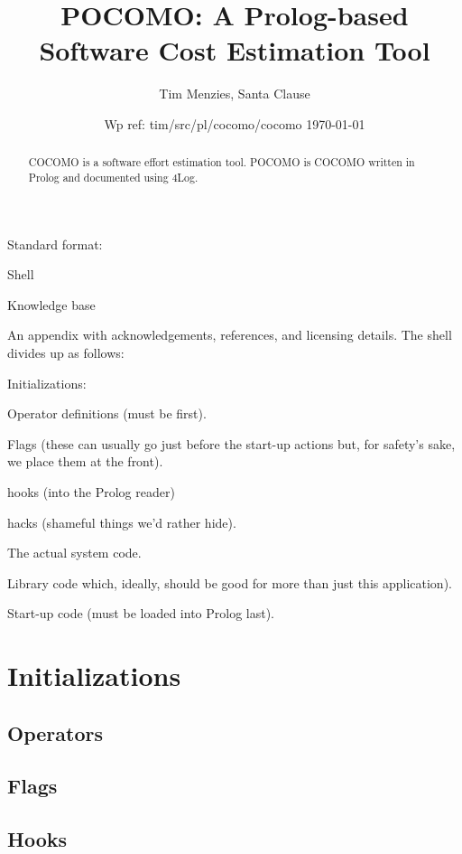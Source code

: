 \documentclass[twocolumn,global]{svjour}
\date{Wp ref: tim/src/pl/cocomo/cocomo \today}
\newcommand{\ME}{POCOMO}
\begin{document}
\title{\ME: A Prolog-based Software Cost Estimation Tool}
\author{Tim Menzies, Santa Clause}
\institute{}
\maketitle
\thispagestyle{empty}\pagestyle{plain}
 \begin{abstract}
COCOMO is a software effort estimation tool.
POCOMO is COCOMO written in Prolog and documented using
{\Tex4Log}.
\end{abstract} 
\setcounter{tocdepth}{4}\tableofcontents\listoffigures
\section{%
}
 Standard format:
\bi
\item
Shell
\item Knowledge base
\item 
An appendix with acknowledgements, references, and licensing details.
\ei
The shell divides up as follows:
\bi
\item Initializations:
\bi
\item
Operator definitions (must be first).
\item
Flags (these can usually go just before the start-up
actions but, for safety's sake, we place them at the
front).
\item
hooks (into the Prolog reader)
\item
hacks (shameful things we'd rather hide).
\ei
\item
The actual system code.
\item
Library code which, ideally,
should be good for more than just this application).
\item
Start-up code (must be loaded into Prolog last).
\ei 
\section{ Initializations
}
\subsection{ Operators
}
\subsection{ Flags
}
\subsection{ Hooks
}
\end{document}
